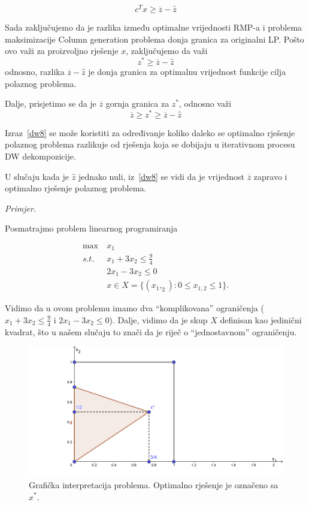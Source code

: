 \documentclass[a4paper, utf8, 11pt, colorlinks]{book}
\begin{document}
 $$ c^Tx\geqslant \overline{z}-\hat{z}$$
 
 Sada zaključujemo da je razlika između optimalne vrijednosti RMP-a i problema maksimizacije Column generation problema donja granica za originalni LP. Pošto ovo važi za proizvoljno rješenje $x$, zaključujemo da važi 
 $$z^*\geqslant \overline{z}-\hat{z}$$
 odnosno, razlika $\overline{z}-\hat{z}$ je donja granica za optimalnu vrijednost funkcije cilja polaznog problema.
 
 Dalje, prisjetimo se da je $\overline{z}$ gornja granica za $z^*$, odnosno važi 
\begin{equation}\label{dw8}
	  \overline{z}\geqslant z^*\geqslant \overline{z}-\hat{z}
\end{equation}
 
 Izraz~\ref{dw8} se može koristiti za određivanje koliko daleko se optimalno rješenje polaznog problema razlikuje od rješenja koja se dobijaju u iterativnom procesu DW dekompozicije.
 
 U slučaju kada je $\hat{z}$ jednako nuli, iz~\ref{dw8} se vidi da je vrijednost $\overline{z}$ zapravo i optimalno rješenje polaznog problema.
 
 \emph{Primjer.}%
 
 Posmatrajmo problem linearnog programiranja
 
   \begin{equation}
 	\begin{aligned}\label{primjer:dw1}
 		\max\  &x_1\\
 		s.t.\  &x_1+3x_2\leqslant \frac94\\
 		 &2x_1-3x_2\leqslant 0\\
 		&x \in X=\{(x_1,_2):0\leqslant x_{1, 2}  \leqslant 1\}.
 	\end{aligned}
 \end{equation}
 
 Vidimo da u ovom problemu imamo dva ``komplikovana'' ograničenja ($x_1+3x_2\leqslant \frac94$ i
 $2x_1-3x_2\leqslant 0$). Dalje, vidimo da je skup $X$ definisan kao jedinični kvadrat, što u našem slučaju to znači da je riječ o ``jednostavnom'' ograničenju. 
 
 \begin{figure}\label{fig:dw1}
 	
 	\includegraphics[scale=4]{dw2.png}
 	\caption{Grafička interpretacija problema. Optimalno rješenje je označeno sa $x^*$. }
 \end{figure}
 
\end{document}
